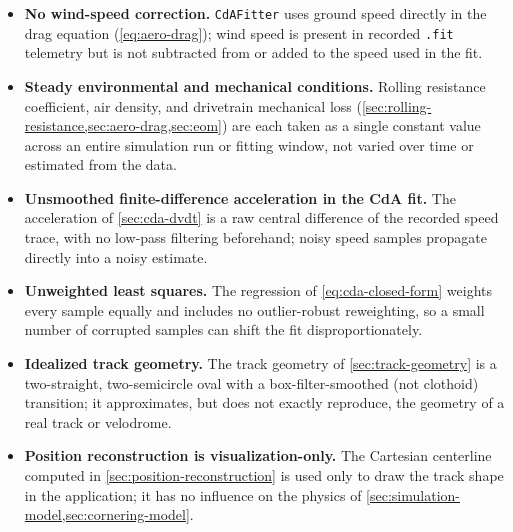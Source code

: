 \begin{itemize}
    \item \textbf{No wind-speed correction.} \nolinkurl{CdAFitter} uses ground
    speed directly in the drag equation (\cref{eq:aero-drag}); wind speed is
    present in recorded \nolinkurl{.fit} telemetry but is not subtracted from or
    added to the speed used in the fit.

    \item \textbf{Steady environmental and mechanical conditions.} Rolling
    resistance coefficient, air density, and drivetrain mechanical loss
    (\cref{sec:rolling-resistance,sec:aero-drag,sec:eom}) are each taken as a
    single constant value across an entire simulation run or fitting window,
    not varied over time or estimated from the data.

    \item \textbf{Unsmoothed finite-difference acceleration in the CdA fit.} The
    acceleration of \cref{sec:cda-dvdt} is a raw central difference of the
    recorded speed trace, with no low-pass filtering beforehand; noisy speed
    samples propagate directly into a noisy \CdA{} estimate.

    \item \textbf{Unweighted least squares.} The regression of
    \cref{eq:cda-closed-form} weights every sample equally and includes no
    outlier-robust reweighting, so a small number of corrupted samples can shift
    the fit disproportionately.

    \item \textbf{Idealized track geometry.} The track geometry of
    \cref{sec:track-geometry} is a two-straight, two-semicircle oval with a
    box-filter-smoothed (not clothoid) transition; it approximates, but does not
    exactly reproduce, the geometry of a real track or velodrome.

    \item \textbf{Position reconstruction is visualization-only.} The
    Cartesian centerline computed in \cref{sec:position-reconstruction} is used
    only to draw the track shape in the application; it has no influence on the
    physics of \cref{sec:simulation-model,sec:cornering-model}.
\end{itemize}
